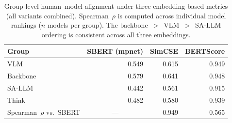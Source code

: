 \begin{table}[h]
\centering
\small
\caption{Group-level human--model alignment under three embedding-based metrics (all variants combined). Spearman~$\rho$ is computed across individual model rankings ($n$ models per group). The backbone~$>$~VLM~$>$~SA-LLM ordering is consistent across all three embeddings.}
\label{tab:robustness_embedding}
\begin{tabular}{lrrr}
\toprule
Group & SBERT (mpnet) & SimCSE & BERTScore \\
\midrule
VLM & 0.549 & 0.615 & 0.949 \\
Backbone & 0.579 & 0.641 & 0.948 \\
SA-LLM & 0.442 & 0.561 & 0.915 \\
Think & 0.482 & 0.580 & 0.939 \\
\midrule
Spearman~$\rho$ vs.\ SBERT & \multicolumn{1}{c}{---} & 0.949 & 0.565 \\
\bottomrule
\end{tabular}
\end{table}
